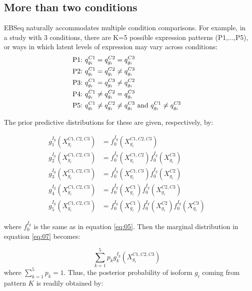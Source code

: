 \documentclass{article}
\begin{document}
\subsection{More than two conditions}
\label{sec:multicondmodel}
EBSeq naturally accommodates multiple condition comparisons.
For example, in a study with 3 conditions, there are K=5 possible expression patterns (P1,...,P5), or ways in which
latent levels of expression may vary across conditions:
\begin{align}
\textrm {P1:}& \hspace{0.05in} q_{g_i}^{C1} = q_{g_i}^{C2}=q_{g_i}^{C3} \nonumber \\
\textrm {P2:}& \hspace{0.05in} q_{g_i}^{C1} = q_{g_i}^{C2} \neq q_{g_i}^{C3} \nonumber \\
\textrm {P3:}& \hspace{0.05in} q_{g_i}^{C1} = q_{g_i}^{C3} \neq q_{g_i}^{C2} \nonumber \\
\textrm {P4:}& \hspace{0.05in} q_{g_i}^{C1} \neq q_{g_i}^{C2} = q_{g_i}^{C3} \nonumber \\
\textrm {P5:}& \hspace{0.05in} q_{g_i}^{C1} \neq q_{g_i}^{C2} \neq
q_{g_i}^{C3} \textrm{ and } q_{g_i}^{C1} \neq q_{g_i}^{C3} \nonumber
\end{align}

\noindent The prior predictive distributions for these are given, respectively, by:

\begin{align}
g_1^{I_g}(X_{g_i}^{C1,C2,C3}) &= f_0^{I_g}(X_{g_i}^{C1,C2,C3}) \nonumber \\
g_2^{I_g}(X_{g_i}^{C1,C2,C3}) &= f_0^{I_g}(X_{g_i}^{C1,C2})f_0^{I_g}(X_{g_i}^{C3}) \nonumber \\
g_3^{I_g}(X_{g_i}^{C1,C2,C3}) &= f_0^{I_g}(X_{g_i}^{C1,C3})f_0^{I_g}(X_{g_i}^{C2}) \nonumber \\
g_4^{I_g}(X_{g_i}^{C1,C2,C3}) &= f_0^{I_g}(X_{g_i}^{C1})f_0^{I_g}(X_{g_i}^{C2,C3}) \nonumber \\
g_5^{I_g}(X_{g_i}^{C1,C2,C3}) &= f_0^{I_g}(X_{g_i}^{C1})f_0^{I_g}(X_{g_i}^{C2})f_0^{I_g}(X_{g_i}^{C3}) \nonumber
\end{align}

\noindent where $f_0^{I_g}$ is the same as in equation \ref{eq:05}. Then the marginal distribution in 
equation \ref{eq:07} becomes:

\begin{equation}
\sum_{k=1}^5 p_k g_k^{I_g}(X_{g_i}^{C1,C2,C3}) \label{eq:11}
\end{equation}
\noindent where $\sum_{k=1}^5 p_k = 1$. Thus, the posterior probability of
isoform $g_i$ coming from pattern $K$ is readily obtained by:
\end{document}
